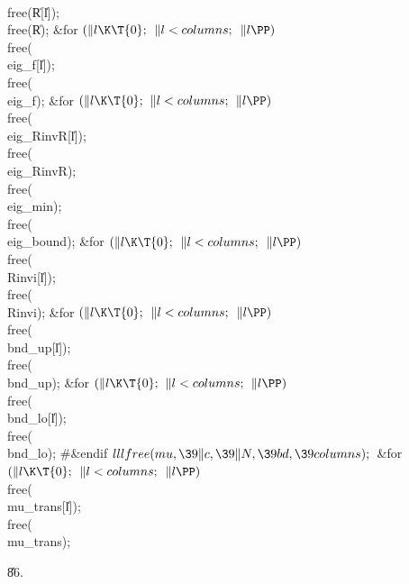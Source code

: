 \\{free}(\|R[\|l]);\2\6
\\{free}(\|R);\6
\&{for} ${}(\|l\K\T{0};{}$ ${}\|l<\\{columns};{}$ ${}\|l\PP){}$\1\5
\\{free}(\\{eig\_f}[\|l]);\2\6
\\{free}(\\{eig\_f});\6
\&{for} ${}(\|l\K\T{0};{}$ ${}\|l<\\{columns};{}$ ${}\|l\PP){}$\1\5
\\{free}(\\{eig\_RinvR}[\|l]);\2\6
\\{free}(\\{eig\_RinvR});\6
\\{free}(\\{eig\_min});\6
\\{free}(\\{eig\_bound});\6
\&{for} ${}(\|l\K\T{0};{}$ ${}\|l<\\{columns};{}$ ${}\|l\PP){}$\1\5
\\{free}(\\{Rinvi}[\|l]);\2\6
\\{free}(\\{Rinvi});\6
\&{for} ${}(\|l\K\T{0};{}$ ${}\|l<\\{columns};{}$ ${}\|l\PP){}$\1\5
\\{free}(\\{bnd\_up}[\|l]);\2\6
\\{free}(\\{bnd\_up});\6
\&{for} ${}(\|l\K\T{0};{}$ ${}\|l<\\{columns};{}$ ${}\|l\PP){}$\1\5
\\{free}(\\{bnd\_lo}[\|l]);\2\6
\\{free}(\\{bnd\_lo});\6
\8\#\&{endif}\6
${}\\{lllfree}(\\{mu},\39\|c,\39\|N,\39\\{bd},\39\\{columns});{}$\6
\&{for} ${}(\|l\K\T{0};{}$ ${}\|l<\\{columns};{}$ ${}\|l\PP){}$\1\5
\\{free}(\\{mu\_trans}[\|l]);\2\6
\\{free}(\\{mu\_trans});\par
\U86.\fi


